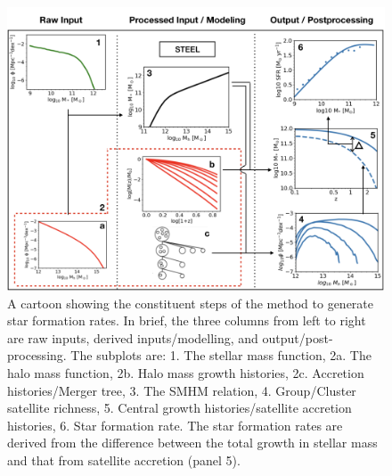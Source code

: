 \begin{figure}[h]
	\centering
	\includegraphics[width = \linewidth]{Figures/Chapter4/SFRFullCartoon.png}
    \caption{A cartoon showing the constituent steps of the method to generate star formation rates. In brief, the three columns from left to right are raw inputs, derived inputs/modelling, and output/post-processing. The subplots are: 1. The stellar mass function, 2a. The halo mass function, 2b. Halo mass growth histories, 2c. Accretion histories/Merger tree, 3. The SMHM relation, 4. Group/Cluster satellite richness, 5. Central growth histories/satellite accretion histories, 6. Star formation rate. The star formation rates are derived from the difference between the total growth in stellar mass and that from satellite accretion (panel 5).}
	\label{fig:SFRDerevation_Cartoon}
\end{figure}

